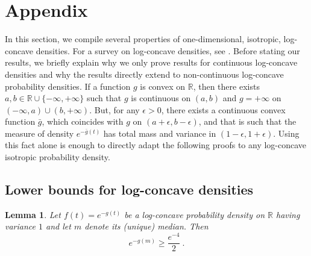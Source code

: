 \documentclass[12pt]{article}
\newcommand{\R}{\mathbb{R}}
\newtheorem{lemma}[theorem]{Lemma}
\begin{document}
\section{Appendix}


In this section, we compile several properties of one-dimensional,
isotropic, log-concave densities. For a survey on log-concave
densities, see \cite{Sam18}. Before stating our results, we briefly explain why we only prove results for continuous log-concave densities and why the results directly extend to non-continuous log-concave probability densities. If a function $g$ is convex on $\R$, then there exists $a,b\in \R\cup \{-\infty,+\infty\} $ such that $g$ is continuous on $(a,b)$ and $g=+\infty$ on $(-\infty,a)\cup(b,+\infty)$. But, for any $\epsilon>0$, there exists a continuous convex function $\bar{g}$, which coincides with $g$ on $(a+\epsilon,b-\epsilon)$, and that is such that  the measure of density $e^{-\bar{g}(t)}$ has total mass and variance in $(1-\epsilon,1+\epsilon)$. Using this fact alone is enough to directly adapt the following proofs to any log-concave isotropic probability density.

\subsection{Lower bounds for log-concave densities}

\begin{lemma}
\label{density lower bound}
Let $f(t) = e^{-g(t)}$ be a log-concave probability density on $\R$
having variance $1$ and let $m$ denote its (unique) median. Then 
$$ e^{-g(m)}\geq \frac{e^{-4}}{2}~.$$
\end{lemma}
\end{document}
